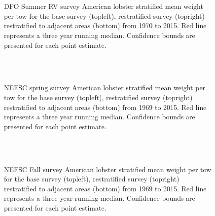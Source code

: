 \documentclass[11pt]{article}
\newcommand{\e}{/backup/bio_data/bio.lobster/figures/} %
\begin{document}
\begin{figure}
\centering
{}
\\
\\

\caption{DFO Summer RV survey American lobster stratified mean weight per tow for the base survey (topleft), restratified survey (topright) restratified to adjacent areas (bottom) from 1970 to 2015. Red line represents a three year running median. Confidence bounds are presented for each point estimate.}
\end{figure}
\clearpage



\begin{figure}
\centering
{}
\\
\\

\caption{NEFSC spring survey American lobster stratified mean weight per tow for the base survey (topleft), restratified survey (topright) restratified to adjacent areas (bottom) from 1969 to 2015. Red line represents a three year running median. Confidence bounds are presented for each point estimate. }
\end{figure}
\clearpage



\begin{figure}
\centering
{}
\\
\\

\caption{NEFSC Fall survey American lobster stratified mean weight per tow for the base survey (topleft), restratified survey (topright) restratified to adjacent areas (bottom) from 1969 to 2015. Red line represents a three year running median. Confidence bounds are presented for each point estimate. }
\end{figure}
\clearpage
\end{document}
